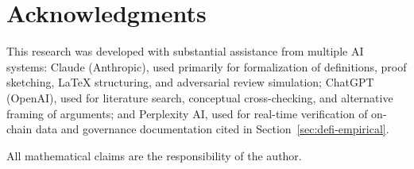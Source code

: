 \section*{Acknowledgments}

This research was developed with substantial assistance from multiple
AI systems: Claude (Anthropic), used primarily for formalization of
definitions, proof sketching, LaTeX structuring, and adversarial review
simulation; ChatGPT (OpenAI), used for literature search, conceptual
cross-checking, and alternative framing of arguments; and Perplexity AI,
used for real-time verification of on-chain data and governance
documentation cited in Section~\ref{sec:defi-empirical}.

All mathematical claims are the responsibility of the author.
